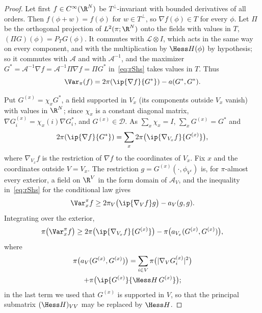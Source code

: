\begin{proof}
Let first $f\in C^\infty(\R^N)$ be $T^\perp$-invariant with bounded
derivatives of all orders. Then $f(\phi+w)=f(\phi)$ for $w\in T^\perp$, so
$\nabla f(\phi)\in T$ for every $\phi$. Let $\Pi$ be the orthogonal
projection of $L^2(\pi;\R^N)$ onto the fields with values in $T$, $(\Pi G)
(\phi)=P_TG(\phi)$. It commutes with $\mathcal L\otimes I$, which acts in
the same way on every component, and with the multiplication by $\Hess H
(\phi)$ by hypothesis; so it commutes with $\mathcal A$ and with $\mathcal
A^{-1}$, and the maximizer $G^*=\mathcal A^{-1}\nabla f=\mathcal A^{-1}\Pi
\nabla f=\Pi G^*$ in~\eqref{eq:rShs} takes values in $T$. Thus
\begin{equation}\label{eq:rSvar}
\Var_\pi(f)=2\pi(\ip{\nabla f}{G^*})-a(G^*,G^*).
\end{equation}

Put $G^{(x)}=\chi_xG^*$, a field supported in $V_x$ (its components outside
$V_x$ vanish) with values in $\R^N$; since $\chi_x$ is a constant diagonal
matrix, $\nabla G^{(x)}_i=\chi_x(i)\nabla G^*_i$, and $G^{(x)}\in\mathcal D$.
As $\sum_x\chi_x=I$, $\sum_xG^{(x)}=G^*$ and
\begin{equation}\label{eq:rSsplit}
2\pi(\ip{\nabla f}{G^*})=\sum_x2\pi\bigl(\ip{\nabla_{V_x}f}{G^{(x)}}\bigr),
\end{equation}
where $\nabla_{V_x}f$ is the restriction of $\nabla f$ to the coordinates of
$V_x$. Fix $x$ and the coordinates outside $V=V_x$. The restriction $g=
G^{(x)}(\cdot,\phi_{V^c})$ is, for $\pi$-almost every exterior, a field on
$\R^V$ in the form domain of $\mathcal A_V$, and the inequality
in~\eqref{eq:rShs} for the conditional law gives
\[
\Var^\pi_xf\ge2\pi_V\bigl(\ip{\nabla_Vf}g\bigr)-a_V(g,g).
\]
Integrating over the exterior,
\begin{equation}\label{eq:rScond}
\pi\bigl(\Var^\pi_xf\bigr)\ge2\pi\bigl(\ip{\nabla_{V_x}f}{G^{(x)}}\bigr)-\pi
\bigl(a_{V_x}(G^{(x)},G^{(x)})\bigr),
\end{equation}
where
\begin{multline*}
\pi\bigl(a_V(G^{(x)},G^{(x)})\bigr)=\sum_{i\in V}\pi\bigl(\lvert\nabla_VG^{(x)}_i
\rvert^2\bigr)\\+\pi\bigl(\ip{G^{(x)}}{\Hess H\,G^{(x)}}\bigr);
\end{multline*}
in the last term we used that $G^{(x)}$ is supported in $V$, so that the
principal submatrix $(\Hess H)_{VV}$ may be replaced by $\Hess H$.


\end{proof}
